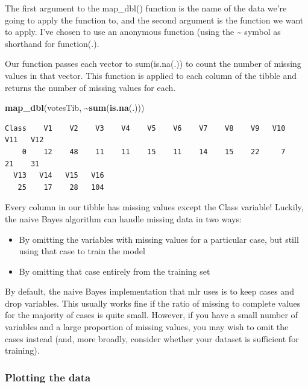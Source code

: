 \documentclass[
]{article}
\newenvironment{Shaded}{\begin{snugshade}}{\end{snugshade}}
\newcommand{\FunctionTok}[1]{\textcolor[rgb]{0.13,0.29,0.53}{\textbf{#1}}}
\newcommand{\NormalTok}[1]{#1}
\newcommand{\SpecialCharTok}[1]{\textcolor[rgb]{0.81,0.36,0.00}{\textbf{#1}}}
\providecommand{\tightlist}{%
  \setlength{\itemsep}{0pt}\setlength{\parskip}{0pt}}
\begin{document}
The first argument to the map\_dbl() function is the name of the data
we're going to apply the function to, and the second argument is the
function we want to apply. I've chosen to use an anonymous function
(using the \textasciitilde{} symbol as shorthand for function(.).

Our function passes each vector to sum(is.na(.)) to count the number of
missing values in that vector. This function is applied to each column
of the tibble and returns the number of missing values for each.

\begin{Shaded}
\begin{Highlighting}[]
\FunctionTok{map\_dbl}\NormalTok{(votesTib, }\SpecialCharTok{\textasciitilde{}}\FunctionTok{sum}\NormalTok{(}\FunctionTok{is.na}\NormalTok{(.)))}
\end{Highlighting}
\end{Shaded}

\begin{verbatim}
Class    V1    V2    V3    V4    V5    V6    V7    V8    V9   V10   V11   V12 
    0    12    48    11    11    15    11    14    15    22     7    21    31 
  V13   V14   V15   V16 
   25    17    28   104 
\end{verbatim}

Every column in our tibble has missing values except the Class variable!
Luckily, the naive Bayes algorithm can handle missing data in two ways:

\begin{itemize}
\tightlist
\item
  By omitting the variables with missing values for a particular case,
  but still using that case to train the model
\item
  By omitting that case entirely from the training set
\end{itemize}

By default, the naive Bayes implementation that mlr uses is to keep
cases and drop variables. This usually works fine if the ratio of
missing to complete values for the majority of cases is quite small.
However, if you have a small number of variables and a large proportion
of missing values, you may wish to omit the cases instead (and, more
broadly, consider whether your dataset is sufficient for training).

\subsubsection{Plotting the data}\label{plotting-the-data-2}
\end{document}
